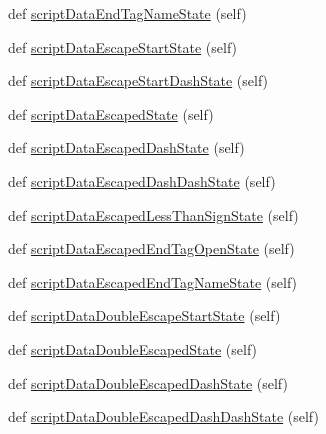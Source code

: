 \begin{DoxyCompactItemize}
def \hyperlink{classpip_1_1__vendor_1_1html5lib_1_1__tokenizer_1_1HTMLTokenizer_add268458ace6581fdd03ef63cbeee75e}{script\+Data\+End\+Tag\+Name\+State} (self)
\item 
def \hyperlink{classpip_1_1__vendor_1_1html5lib_1_1__tokenizer_1_1HTMLTokenizer_a0b6b0ce8fd315f1ecc9e5db13c6118ba}{script\+Data\+Escape\+Start\+State} (self)
\item 
def \hyperlink{classpip_1_1__vendor_1_1html5lib_1_1__tokenizer_1_1HTMLTokenizer_a32ec556ae25d287022f485a3113599f9}{script\+Data\+Escape\+Start\+Dash\+State} (self)
\item 
def \hyperlink{classpip_1_1__vendor_1_1html5lib_1_1__tokenizer_1_1HTMLTokenizer_ade2a0986d939b76868f140564a45418d}{script\+Data\+Escaped\+State} (self)
\item 
def \hyperlink{classpip_1_1__vendor_1_1html5lib_1_1__tokenizer_1_1HTMLTokenizer_a659b3dc3e0726fe964a432be7e267015}{script\+Data\+Escaped\+Dash\+State} (self)
\item 
def \hyperlink{classpip_1_1__vendor_1_1html5lib_1_1__tokenizer_1_1HTMLTokenizer_a9cc43c181b8818e138e16349c5c816b0}{script\+Data\+Escaped\+Dash\+Dash\+State} (self)
\item 
def \hyperlink{classpip_1_1__vendor_1_1html5lib_1_1__tokenizer_1_1HTMLTokenizer_ac61539fbef24af40395cbf23f2fcf8a6}{script\+Data\+Escaped\+Less\+Than\+Sign\+State} (self)
\item 
def \hyperlink{classpip_1_1__vendor_1_1html5lib_1_1__tokenizer_1_1HTMLTokenizer_a44f8477a916259c56e22398479f46679}{script\+Data\+Escaped\+End\+Tag\+Open\+State} (self)
\item 
def \hyperlink{classpip_1_1__vendor_1_1html5lib_1_1__tokenizer_1_1HTMLTokenizer_a28844de32a0c4634a9767614536a6948}{script\+Data\+Escaped\+End\+Tag\+Name\+State} (self)
\item 
def \hyperlink{classpip_1_1__vendor_1_1html5lib_1_1__tokenizer_1_1HTMLTokenizer_a14ad368562619e5d757e7acf910d18a8}{script\+Data\+Double\+Escape\+Start\+State} (self)
\item 
def \hyperlink{classpip_1_1__vendor_1_1html5lib_1_1__tokenizer_1_1HTMLTokenizer_a12074fe2e5969b354c0947056f72e44a}{script\+Data\+Double\+Escaped\+State} (self)
\item 
def \hyperlink{classpip_1_1__vendor_1_1html5lib_1_1__tokenizer_1_1HTMLTokenizer_ad6b3a31475cf29c9cc54c584efd90c8e}{script\+Data\+Double\+Escaped\+Dash\+State} (self)
\item 
def \hyperlink{classpip_1_1__vendor_1_1html5lib_1_1__tokenizer_1_1HTMLTokenizer_a24f1d17718847f0b9fe606afd7a72f2d}{script\+Data\+Double\+Escaped\+Dash\+Dash\+State} (self)

\end{DoxyCompactItemize}
